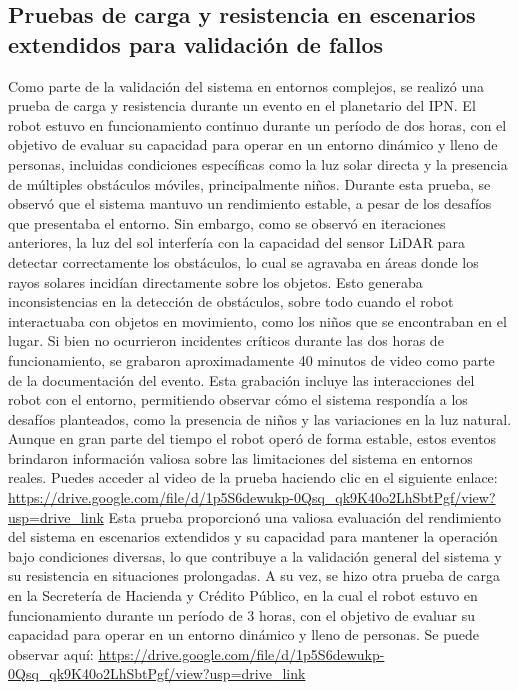 \subsection{Pruebas de carga y resistencia en escenarios extendidos para validaci\'on de fallos}
\label{sub:PruebasDeCarga02}
    Como parte de la validaci\'on del sistema en entornos complejos, se realiz\'o una prueba de carga  
        y resistencia durante un evento en el planetario del IPN. El robot estuvo en funcionamiento 
        continuo durante un per\'iodo de dos horas, con el objetivo de evaluar su capacidad para operar 
        en un entorno din\'amico y lleno de personas, incluidas condiciones espec\'ificas como la luz solar 
        directa y la presencia de m\'ultiples obst\'aculos m\'oviles, principalmente ni\~nos.
    \vskip 0.5cm
    Durante esta prueba, se observ\'o que el sistema mantuvo un rendimiento estable, a pesar de los desaf\'ios 
        que presentaba el entorno. Sin embargo, como se observ\'o en iteraciones anteriores, la luz del 
        sol interfer\'ia con la capacidad del sensor LiDAR para detectar correctamente los obst\'aculos, 
        lo cual se agravaba en \'areas donde los rayos solares incid\'ian directamente sobre los objetos. 
        Esto generaba inconsistencias en la detecci\'on de obst\'aculos, sobre todo cuando el robot interactuaba 
        con objetos en movimiento, como los ni\~nos que se encontraban en el lugar.
    \vskip 0.5cm
    Si bien no ocurrieron incidentes cr\'iticos durante las dos horas de funcionamiento, se grabaron aproximadamente 
        40 minutos de video como parte de la documentaci\'on del evento. Esta grabaci\'on incluye las interacciones 
        del robot con el entorno, permitiendo observar c\'omo el sistema respond\'ia a los desaf\'ios planteados, como 
        la presencia de ni\~nos y las variaciones en la luz natural. Aunque en gran parte del tiempo el robot oper\'o 
        de forma estable, estos eventos brindaron informaci\'on valiosa sobre las limitaciones del sistema en entornos reales.
    \vskip 0.5cm
    Puedes acceder al video de la prueba haciendo clic en el siguiente enlace: \url{https://drive.google.com/file/d/1p5S6dewukp-0Qsq_qk9K40o2LhSbtPgf/view?usp=drive_link}
    \vskip 0.5cm
    Esta prueba proporcion\'o una valiosa evaluaci\'on del rendimiento del sistema en escenarios extendidos y su 
        capacidad para mantener la operaci\'on bajo condiciones diversas, lo que contribuye a la validaci\'on general 
        del sistema y su resistencia en situaciones prolongadas.
    \vskip 0.5cm
    A su vez, se hizo otra prueba de carga en la Secreter\'ia de Hacienda y Cr\'edito P\'ublico, en la cual el robot 
        estuvo en funcionamiento durante un per\'iodo de 3 horas, con el objetivo de evaluar su capacidad para operar 
        en un entorno din\'amico y lleno de personas. Se puede observar aqu\'i: \url{https://drive.google.com/file/d/1p5S6dewukp-0Qsq_qk9K40o2LhSbtPgf/view?usp=drive_link}
